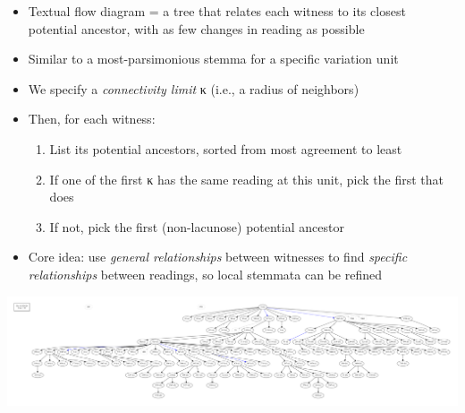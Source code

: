 \documentclass[10pt]{beamer}
\begin{document}
	\begin{frame}
		\begin{itemize}
			\item Textual flow diagram = a tree that relates each witness to its closest potential ancestor, with as few changes in reading as possible
			\item Similar to a most-parsimonious stemma for a specific variation unit
			\item We specify a \emph{connectivity limit} {\renewfontfamily{}\textgreek{κ}} (i.e., a radius of  neighbors)
			\item Then, for each witness:
			\begin{enumerate}
				\item List its potential ancestors, sorted from most agreement to least
				\item If one of the first {\renewfontfamily{}\textgreek{κ}} has the same reading at this unit, pick the first that does
				\item If not, pick the first (non-lacunose) potential ancestor
			\end{enumerate}
			\item Core idea: use \emph{general relationships} between witnesses to find \emph{specific relationships} between readings, so local stemmata can be refined
		\end{itemize}
		\begin{center}
			\includegraphics[width=\textwidth]{../img/B25K1V13U24-26-textual-flow.pdf}
		\end{center}
	\end{frame}
\end{document}
